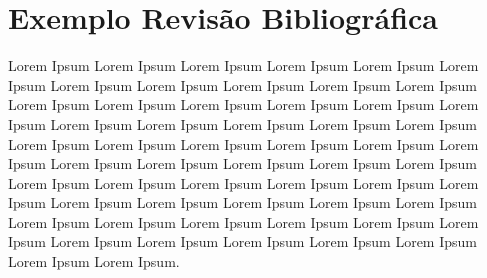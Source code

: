 \section{Exemplo Revisão Bibliográfica}

Lorem Ipsum Lorem Ipsum Lorem Ipsum Lorem Ipsum Lorem Ipsum Lorem Ipsum Lorem Ipsum Lorem Ipsum Lorem Ipsum Lorem Ipsum Lorem Ipsum Lorem Ipsum Lorem Ipsum Lorem Ipsum Lorem Ipsum Lorem Ipsum Lorem Ipsum Lorem Ipsum Lorem Ipsum Lorem Ipsum Lorem Ipsum Lorem Ipsum Lorem Ipsum Lorem Ipsum Lorem Ipsum Lorem Ipsum Lorem Ipsum Lorem Ipsum Lorem Ipsum Lorem Ipsum Lorem Ipsum Lorem Ipsum Lorem Ipsum Lorem Ipsum Lorem Ipsum Lorem Ipsum Lorem Ipsum Lorem Ipsum Lorem Ipsum Lorem Ipsum Lorem Ipsum Lorem Ipsum Lorem Ipsum Lorem Ipsum Lorem Ipsum Lorem Ipsum Lorem Ipsum Lorem Ipsum Lorem Ipsum Lorem Ipsum Lorem Ipsum Lorem Ipsum Lorem Ipsum Lorem Ipsum Lorem Ipsum Lorem Ipsum Lorem Ipsum.
